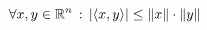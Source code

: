 \begin{multicols}{2}
			\begin{theorem}
				\begin{equation*}
					\forall x,y \in \mathbb{R}^n \, : \, \left\vert \left\langle x, y \right\rangle \right\vert \leq \left\Vert x \right\Vert \cdot \left\Vert y \right\Vert
				\end{equation*}
			\end{theorem}
		
		
		
	\end{multicols}

